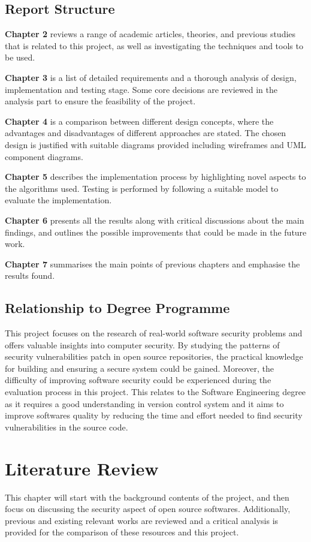 \documentclass[12pt, a4paper]{report}
\begin{document}
\section{Report Structure}
\textbf{Chapter 2} reviews a range of academic articles, theories, and previous studies that is
related to this project, as well as investigating the techniques and tools to be used.

\noindent\textbf{Chapter 3} is a list of detailed requirements and a thorough analysis of design,
implementation and testing stage. Some core decisions are reviewed in the analysis part to ensure
the feasibility of the project.

\noindent\textbf{Chapter 4} is a comparison between different design concepts, where the advantages
and disadvantages of different approaches are stated. The chosen design is justified with suitable
diagrams provided including wireframes and UML component diagrams.

\noindent\textbf{Chapter 5} describes the implementation process by highlighting novel aspects to
the algorithms used. Testing is performed by following a suitable model to evaluate the
implementation.

\noindent\textbf{Chapter 6} presents all the results along with critical discussions about the main
findings,	and outlines the possible improvements that could be made in the future work.

\noindent\textbf{Chapter 7} summarises the main points of previous chapters and emphasise the
results found.

\section{Relationship to Degree Programme}
This project focuses on the research of real-world software security problems and offers valuable
insights into computer security. By studying the patterns of security vulnerabilities patch in open
source repositories, the practical knowledge for building and ensuring a secure system could be
gained. Moreover, the difficulty of improving software security could be experienced during the
evaluation process in this project. This relates to the Software Engineering degree as it requires a
good understanding in version control system and it aims to improve softwares quality by reducing
the time and effort needed to find security vulnerabilities in the source code.

\chapter{Literature Review}
This chapter will start with the background contents of the project, and then focus on discussing
the security aspect of open source softwares. Additionally, previous and existing relevant works are
reviewed and a critical analysis is provided for the comparison of these resources and this project.
\end{document}
